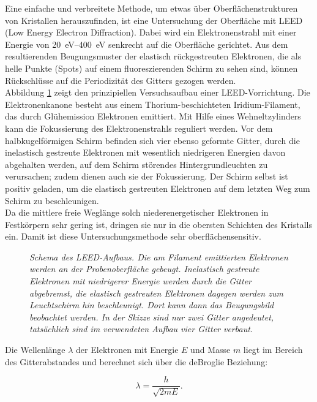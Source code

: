 \FloatBarrier

Eine einfache und verbreitete Methode, um etwas über Oberflächenstrukturen von
 Kristallen herauszufinden, ist eine Untersuchung der Oberfläche mit LEED (Low Energy Electron
 Diffraction).
 Dabei wird ein Elektronenstrahl mit einer Energie von \SIrange{20}{400}{eV} senkrecht auf die
 Oberfläche gerichtet. Aus dem resultierenden
 Beugungsmus\-ter der elastisch rückgestreuten Elektronen, die als helle Punkte (Spots) auf einem 
 fluoreszierenden Schirm zu sehen sind, können Rückschlüsse auf die Periodizität des Gitters gezogen werden.
 \\
  Abbildung \ref{leedaufbau} zeigt den prinzipiellen Versuchsaufbau einer LEED-Vorrichtung. Die
 Elektronenkanone besteht aus einem Thorium-beschichteten Iridium-Filament, das durch Glühemission
 Elektronen emittiert. Mit Hilfe eines Wehneltzylinders kann die Fokussierung
 des Elektronenstrahls reguliert werden. Vor dem halbkugelförmigen Schirm befinden
 sich vier ebenso geformte Gitter, durch die inelastisch gestreute Elektronen mit wesentlich
 niedrigeren Energien davon abgehalten werden, auf dem Schirm störendes Hintergrundleuchten zu
 verursachen; zudem dienen auch sie der Fokussierung. Der Schirm selbst ist positiv geladen, um
 die elastisch gestreuten Elektronen auf dem letzten Weg zum Schirm zu beschleunigen.
 \\
  Da die mittlere freie Weglänge solch niederenergetischer Elektronen in
 Festkörpern sehr gering ist, dringen sie nur in die obersten Schichten des
 Kristalls ein. Damit ist diese Untersuchungsmethode sehr oberflächensensitiv.

 \begin{figure}[htbp]
	\centering
	\sffamily 
	
	\caption{\textit{Schema des LEED-Aufbaus. Die am Filament emittierten Elektronen werden an der
	Probenoberfläche gebeugt. Inelastisch gestreute Elektronen mit nied\-rig\-erer Energie werden durch
	die Gitter abgebremst, die elastisch gestreuten Elektronen dagegen werden zum Leuchtschirm
	hin beschleunigt. Dort kann dann das Beugungsbild beobachtet werden. In der Skizze sind nur zwei
	Gitter angedeutet, tatsächlich sind im verwendeten Aufbau vier Gitter verbaut.}}
	\label{leedaufbau}
\end{figure}

 Die Wellenlänge $\lambda$ der Elektronen mit Energie $E$ und Masse $m$ liegt im Bereich des
 Gitterabstandes und berechnet sich über die deBroglie Beziehung:
 
 \[\lambda=\frac{h}{\sqrt{2mE}}.\]%
 
